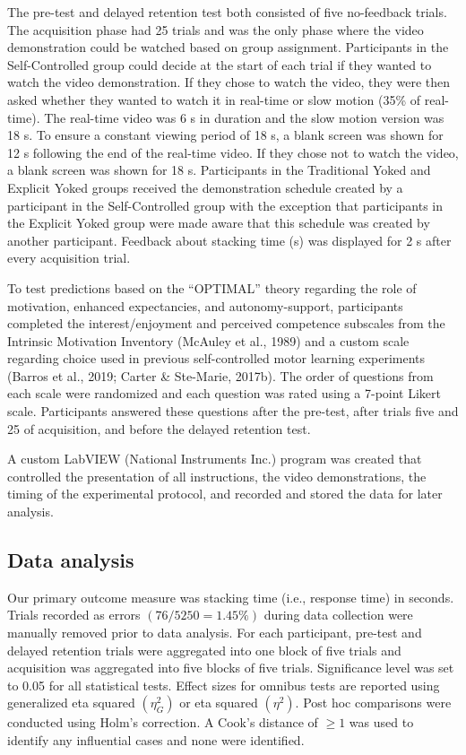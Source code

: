 \documentclass[
  english,
  man,floatsintext]{apa7}
\begin{document}
The pre-test and delayed retention test both consisted of five no-feedback trials. The acquisition phase had 25 trials and was the only phase where the video demonstration could be watched based on group assignment. Participants in the Self-Controlled group could decide at the start of each trial if they wanted to watch the video demonstration. If they chose to watch the video, they were then asked whether they wanted to watch it in real-time or slow motion (35\% of real-time). The real-time video was 6 s in duration and the slow motion version was 18 s. To ensure a constant viewing period of 18 s, a blank screen was shown for 12 s following the end of the real-time video. If they chose not to watch the video, a blank screen was shown for 18 s. Participants in the Traditional Yoked and Explicit Yoked groups received the demonstration schedule created by a participant in the Self-Controlled group with the exception that participants in the Explicit Yoked group were made aware that this schedule was created by another participant. Feedback about stacking time (s) was displayed for 2 s after every acquisition trial.

To test predictions based on the ``OPTIMAL'' theory regarding the role of motivation, enhanced expectancies, and autonomy-support, participants completed the interest/enjoyment and perceived competence subscales from the Intrinsic Motivation Inventory (McAuley et al., 1989) and a custom scale regarding choice used in previous self-controlled motor learning experiments (Barros et al., 2019; Carter \& Ste-Marie, 2017b). The order of questions from each scale were randomized and each question was rated using a 7-point Likert scale. Participants answered these questions after the pre-test, after trials five and 25 of acquisition, and before the delayed retention test.

A custom LabVIEW (National Instruments Inc.) program was created that controlled the presentation of all instructions, the video demonstrations, the timing of the experimental protocol, and recorded and stored the data for later analysis.

\hypertarget{data-analysis}{%
\subsection{Data analysis}\label{data-analysis}}

Our primary outcome measure was stacking time (i.e., response time) in seconds. Trials recorded as errors \((76/5250 = 1.45\%)\) during data collection were manually removed prior to data analysis. For each participant, pre-test and delayed retention trials were aggregated into one block of five trials and acquisition was aggregated into five blocks of five trials. Significance level was set to 0.05 for all statistical tests. Effect sizes for omnibus tests are reported using generalized eta squared \((\eta^2_{G})\) or eta squared \((\eta^2)\). Post hoc comparisons were conducted using Holm's correction. A Cook's distance of \(\geq 1\) was used to identify any influential cases and none were identified.
\end{document}
